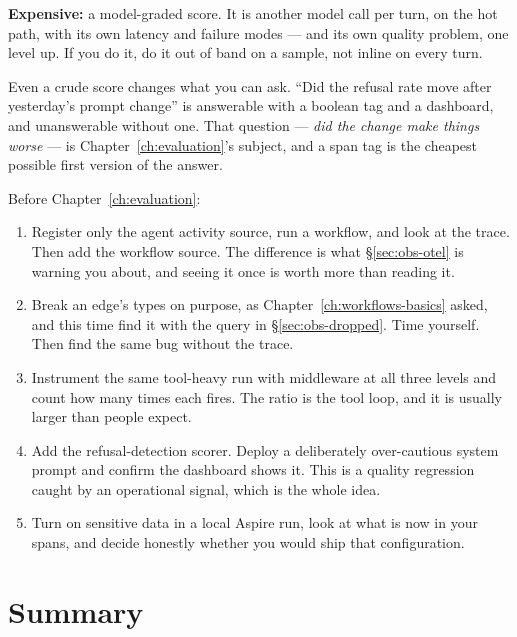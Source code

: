 \textbf{Expensive:} a model-graded score. It is another model call per turn, on
the hot path, with its own latency and failure modes --- and its own quality
problem, one level up. If you do it, do it out of band on a sample, not inline on
every turn.

\begin{note}
Even a crude score changes what you can ask. ``Did the refusal rate move after
yesterday's prompt change'' is answerable with a boolean tag and a dashboard, and
unanswerable without one. That question --- \emph{did the change make things
worse} --- is Chapter~\ref{ch:evaluation}'s subject, and a span tag is the
cheapest possible first version of the answer.
\end{note}

\begin{exercisebox}
Before Chapter~\ref{ch:evaluation}:

\begin{enumerate}[leftmargin=1.4em]
\item Register only the agent activity source, run a workflow, and look at the
      trace. Then add the workflow source. The difference is what
      \S\ref{sec:obs-otel} is warning you about, and seeing it once is worth more
      than reading it.
\item Break an edge's types on purpose, as Chapter~\ref{ch:workflows-basics}
      asked, and this time find it with the query in \S\ref{sec:obs-dropped}.
      Time yourself. Then find the same bug without the trace.
\item Instrument the same tool-heavy run with middleware at all three levels and
      count how many times each fires. The ratio is the tool loop, and it is
      usually larger than people expect.
\item Add the refusal-detection scorer. Deploy a deliberately over-cautious
      system prompt and confirm the dashboard shows it. This is a quality
      regression caught by an operational signal, which is the whole idea.
\item Turn on sensitive data in a local Aspire run, look at what is now in your
      spans, and decide honestly whether you would ship that configuration.
\end{enumerate}
\end{exercisebox}

\section{Summary}

